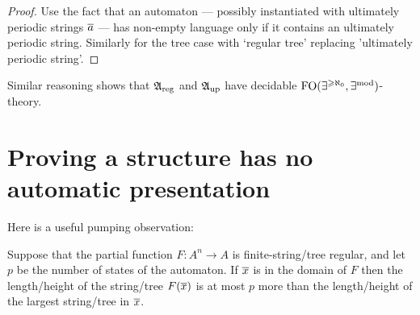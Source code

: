 \begin{proof}
Use the fact that an automaton --- possibly instantiated with ultimately periodic strings $\mbox{$\overline {a}$}$ --- has non-empty language only if it contains an ultimately periodic string. Similarly for the tree case with `regular tree' replacing 'ultimately periodic string'. 
\end{proof}



Similar reasoning shows that $\mathfrak{A}_{\rm{reg}}$ and $\mathfrak{A}_{\rm{up}}$ have decidable $\mbox{\rm FO}(\exists^{\geqslant \aleph_0},\exists^{\rm mod})$-theory.




\section{Proving a structure has no automatic presentation}


Here is a useful pumping observation:



\begin{proposition} \label{AS:prop:locfin} \cite{KhNe95}
Suppose that the partial function $F:A^n \to A$ is finite-string/tree regular, and let $p$ be the number of states of the automaton.
If $\mbox{$\overline {x}$}$ is in the domain of $F$ then the length/height of the string/tree $F(\mbox{$\overline {x}$})$ is at most $p$ more than the length/height of the largest string/tree in $\mbox{$\overline {x}$}$.
\end{proposition}

